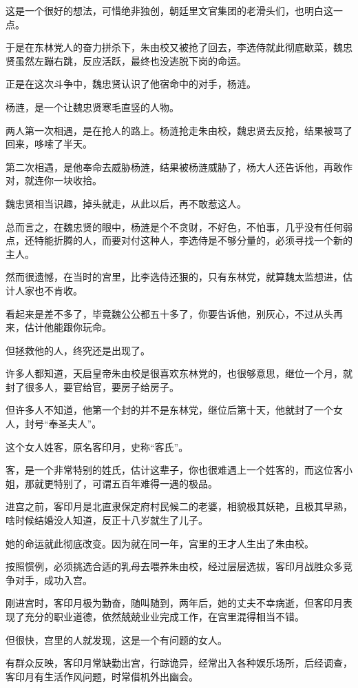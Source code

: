 \begin{multicols}{\theparacolNo}
这是一个很好的想法，可惜绝非独创，朝廷里文官集团的老滑头们，也明白这一点。

于是在东林党人的奋力拼杀下，朱由校又被抢了回去，李选侍就此彻底歇菜，魏忠贤虽然左蹦右跳，反应活跃，最终也没逃脱下岗的命运。

正是在这次斗争中，魏忠贤认识了他宿命中的对手，杨涟。

杨涟，是一个让魏忠贤寒毛直竖的人物。

两人第一次相遇，是在抢人的路上。杨涟抢走朱由校，魏忠贤去反抢，结果被骂了回来，哆嗦了半天。

第二次相遇，是他奉命去威胁杨涟，结果被杨涟威胁了，杨大人还告诉他，再敢作对，就连你一块收拾。

魏忠贤相当识趣，掉头就走，从此以后，再不敢惹这人。

总而言之，在魏忠贤的眼中，杨涟是个不贪财，不好色，不怕事，几乎没有任何弱点，还特能折腾的人，而要对付这种人，李选侍是不够分量的，必须寻找一个新的主人。

然而很遗憾，在当时的宫里，比李选侍还狠的，只有东林党，就算魏太监想进，估计人家也不肯收。

看起来是差不多了，毕竟魏公公都五十多了，你要告诉他，别灰心，不过从头再来，估计他能跟你玩命。

但拯救他的人，终究还是出现了。

许多人都知道，天启皇帝朱由校是很喜欢东林党的，也很够意思，继位一个月，就封了很多人，要官给官，要房子给房子。

但许多人不知道，他第一个封的并不是东林党，继位后第十天，他就封了一个女人，封号“奉圣夫人”。

这个女人姓客，原名客印月，史称“客氏”。

客，是一个非常特别的姓氏，估计这辈子，你也很难遇上一个姓客的，而这位客小姐，那就更特别了，可谓五百年难得一遇的极品。

进宫之前，客印月是北直隶保定府村民候二的老婆，相貌极其妖艳，且极其早熟，啥时候结婚没人知道，反正十八岁就生了儿子。

她的命运就此彻底改变。因为就在同一年，宫里的王才人生出了朱由校。

按照惯例，必须挑选合适的乳母去喂养朱由校，经过层层选拔，客印月战胜众多竞争对手，成功入宫。

刚进宫时，客印月极为勤奋，随叫随到，两年后，她的丈夫不幸病逝，但客印月表现了充分的职业道德，依然兢兢业业完成工作，在宫里混得相当不错。

但很快，宫里的人就发现，这是一个有问题的女人。

有群众反映，客印月常缺勤出宫，行踪诡异，经常出入各种娱乐场所，后经调查，客印月有生活作风问题，时常借机外出幽会。


\end{multicols}
